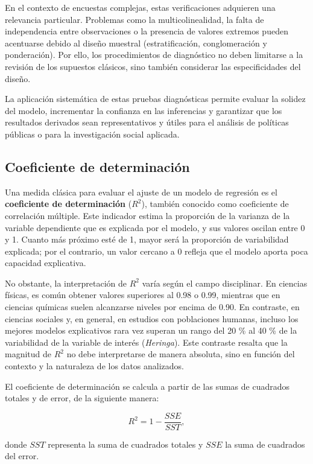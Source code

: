 \documentclass[
  12pt,
]{book}
\begin{document}
En el contexto de encuestas complejas, estas verificaciones adquieren una relevancia particular. Problemas como la multicolinealidad, la falta de independencia entre observaciones o la presencia de valores extremos pueden acentuarse debido al diseño muestral (estratificación, conglomeración y ponderación). Por ello, los procedimientos de diagnóstico no deben limitarse a la revisión de los supuestos clásicos, sino también considerar las especificidades del diseño.

La aplicación sistemática de estas pruebas diagnósticas permite evaluar la solidez del modelo, incrementar la confianza en las inferencias y garantizar que los resultados derivados sean representativos y útiles para el análisis de políticas públicas o para la investigación social aplicada.

\subsection{Coeficiente de determinación}\label{coeficiente-de-determinaciuxf3n}

Una medida clásica para evaluar el ajuste de un modelo de regresión es el \textbf{coeficiente de determinación} (\(R^{2}\)), también conocido como coeficiente de correlación múltiple. Este indicador estima la proporción de la varianza de la variable dependiente que es explicada por el modelo, y sus valores oscilan entre 0 y 1. Cuanto más próximo esté de 1, mayor será la proporción de variabilidad explicada; por el contrario, un valor cercano a 0 refleja que el modelo aporta poca capacidad explicativa.

No obstante, la interpretación de \(R^{2}\) varía según el campo disciplinar. En ciencias físicas, es común obtener valores superiores al 0.98 o 0.99, mientras que en ciencias químicas suelen alcanzarse niveles por encima de 0.90. En contraste, en ciencias sociales y, en general, en estudios con poblaciones humanas, incluso los mejores modelos explicativos rara vez superan un rango del 20 \% al 40 \% de la variabilidad de la variable de interés (\emph{Heringa}). Este contraste resalta que la magnitud de \(R^{2}\) no debe interpretarse de manera absoluta, sino en función del contexto y la naturaleza de los datos analizados.

El coeficiente de determinación se calcula a partir de las sumas de cuadrados totales y de error, de la siguiente manera:

\[
R^{2} = 1 - \frac{SSE}{SST},
\]

donde \(SST\) representa la suma de cuadrados totales y \(SSE\) la suma de cuadrados del error.
\end{document}
